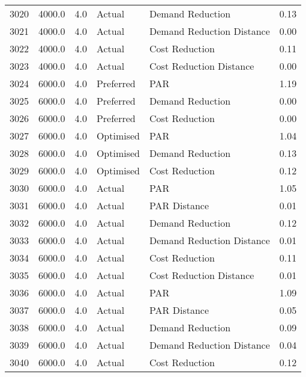 \begin{longtable}{lrrllr}
3020 &       4000.0 &     4.0 &         Actual &           Demand Reduction &   0.13 \\
3021 &       4000.0 &     4.0 &         Actual &  Demand Reduction Distance &   0.00 \\
3022 &       4000.0 &     4.0 &         Actual &             Cost Reduction &   0.11 \\
3023 &       4000.0 &     4.0 &         Actual &    Cost Reduction Distance &   0.00 \\
3024 &       6000.0 &     4.0 &      Preferred &                        PAR &   1.19 \\
3025 &       6000.0 &     4.0 &      Preferred &           Demand Reduction &   0.00 \\
3026 &       6000.0 &     4.0 &      Preferred &             Cost Reduction &   0.00 \\
3027 &       6000.0 &     4.0 &      Optimised &                        PAR &   1.04 \\
3028 &       6000.0 &     4.0 &      Optimised &           Demand Reduction &   0.13 \\
3029 &       6000.0 &     4.0 &      Optimised &             Cost Reduction &   0.12 \\
3030 &       6000.0 &     4.0 &         Actual &                        PAR &   1.05 \\
3031 &       6000.0 &     4.0 &         Actual &               PAR Distance &   0.01 \\
3032 &       6000.0 &     4.0 &         Actual &           Demand Reduction &   0.12 \\
3033 &       6000.0 &     4.0 &         Actual &  Demand Reduction Distance &   0.01 \\
3034 &       6000.0 &     4.0 &         Actual &             Cost Reduction &   0.11 \\
3035 &       6000.0 &     4.0 &         Actual &    Cost Reduction Distance &   0.01 \\
3036 &       6000.0 &     4.0 &         Actual &                        PAR &   1.09 \\
3037 &       6000.0 &     4.0 &         Actual &               PAR Distance &   0.05 \\
3038 &       6000.0 &     4.0 &         Actual &           Demand Reduction &   0.09 \\
3039 &       6000.0 &     4.0 &         Actual &  Demand Reduction Distance &   0.04 \\
3040 &       6000.0 &     4.0 &         Actual &             Cost Reduction &   0.12 \\

\end{longtable}
